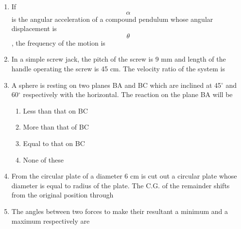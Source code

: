 \documentclass[11pt,a4paper]{article}
\begin{document}
\begin{enumerate}
\item{If $$\alpha $$ is the angular acceleration of a compound pendulum whose angular displacement is $$\theta $$, the frequency of the motion is
}
\\
\item{In a simple screw jack, the pitch of the screw is 9 mm and length of the handle operating the screw is 45 cm. The velocity ratio of the system is}
\\
\item{A sphere is resting on two planes BA and BC which are inclined at 45$^\circ$ and 60$^\circ$ respectively with the horizontal. The reaction on the plane BA will be
}
\begin{enumerate}[label=\Alph*.]
\item{Less than that on BC}
\item{More than that of BC}
\item{Equal to that on BC}
\item{None of these}
\end{enumerate}
\item{From the circular plate of a diameter 6 cm is cut out a circular plate whose diameter is equal to radius of the plate. The C.G. of the remainder shifts from the original position through}
\\\begin{enumerate*}[itemjoin=\qquad, label=\Alph*.]
\item{0.25 cm}
\item{0.50 cm}
\item{0.75 cm}
\item{1.00 cm}
\end{enumerate*}
\item{The angles between two forces to make their resultant a minimum and a maximum respectively are}

\end{enumerate}
\end{document}
